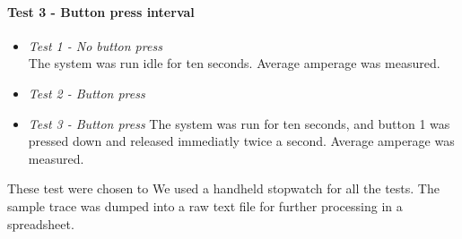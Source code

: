 		\paragraph{Test 3 - Button press interval}



	\begin{itemize}
		\item
		\emph{Test 1 - No button press} \\
		The system was run idle for ten seconds. Average amperage was measured.

		\item
		\emph{Test 2 - Button press} \\
				
		\item
		\emph{Test 3 - Button press}
		The system was run for ten seconds, and button 1 was pressed down and released immediatly twice a second. Average amperage was measured.
	\end{itemize}

	These test were chosen to 
	We used a handheld stopwatch for all the tests. The sample trace was dumped into a raw text file for further processing in a spreadsheet.
